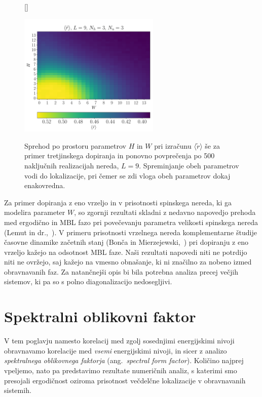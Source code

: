 \begin{figure}[H]
[\FBwidth]
{\caption{Sprehod po prostoru parametrov $H$ in $W$ pri izračunu $\langle \tilde{r}\rangle$ še za primer tretjinskega dopiranja in ponovno povprečenja po 500 naključnih realizacijah nereda, $L=9$. Spreminjanje obeh parametrov vodi do lokalizacije, pri čemer se zdi vloga obeh parametrov dokaj enakovredna. }\label{fig:r_density_9_3_3}}
{\includegraphics[width=0.6\textwidth]{r_density_9_3_3.pdf}}
\end{figure}
\noindent
Za primer dopiranja z eno vrzeljo in v prisotnosti spinskega nereda, ki ga modelira parameter $W$, so zgornji rezultati skladni z nedavno napovedjo prehoda med ergodično in MBL fazo pri povečevanju parametra velikosti spinskega nereda (Lemut in dr.,~\cite{lemut2017complete}). V primeru prisotnosti vrzelnega nereda komplementarne študije časovne dinamike začetnih stanj (Bonča in Mierzejewski,~\cite{PhysRevB.95.214201}) pri dopiranju z eno vrzeljo kažejo na odsotnost MBL faze. Naši rezultati napovedi niti ne potrdijo niti ne ovržejo, saj kažejo na vmesno obnašanje, ki ni značilno za nobeno izmed obravnavanih faz. Za natančnejši opis bi bila potrebna analiza precej večjih sistemov, ki pa so s polno diagonalizacijo nedosegljivi. 
\newpage
 \section{Spektralni oblikovni faktor}
V tem poglavju namesto korelacij med zgolj sosednjimi energijskimi nivoji obravnavamo korelacije med \emph{vsemi} energijskimi nivoji, in sicer z analizo \emph{spektralnega oblikovnega faktorja} (ang.~\emph{spectral form factor}). Količino najprej vpeljemo, nato pa predstavimo rezultate numeričnih analiz, s katerimi smo presojali ergodičnost oziroma prisotnost večdelčne lokalizacije v obravnavanih sistemih. 
\label{spektralni_oblikovni_faktor}
